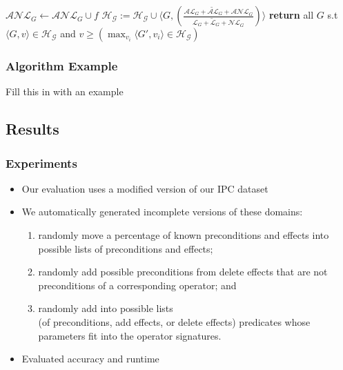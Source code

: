 \documentclass{beamer}
\newcommand{\todo}[1]{ {\color{red} #1} }
\begin{document}
\begin{frame}[c]
\begin{algorithmic}[1]
{							\State $\mathcal{ANL}_{G} \gets \mathcal{ANL}_{G} \cup f$ \label{alg:RecognizeIncompleteDomains:AchievedOverlookedLandmarks}
						\EndIf
					\EndFor
				\EndFor
				\State $\mathcal{H}_{\mathcal{G}} := \mathcal{H}_{\mathcal{G}} \cup \langle G,\left(\frac{\mathcal{AL}_{G} + \mathcal{\widetilde{AL}}_{G} + \mathcal{ANL}_{G}}{\mathcal{L}_{G} + \mathcal{\widetilde{L}}_{G} + \mathcal{NL}_{G}}\right)\rangle$  \label{alg:RecognizeIncompleteDomains:Heuristic}
			\EndFor
			\State \textbf{return} {all $G$ s.t $\langle G, v \rangle \in \mathcal{H}_{\mathcal{G}}$ and \newline \hspace*{\algorithmicindent}{\phantom{return }} $v \geq (\max_{v_i}{ \langle G',v_i \rangle \in \mathcal{H}_{\mathcal{G}}})$} \label{alg:RecognizeIncompleteDomains:Return}
	        \EndFunction
			}
	    \end{algorithmic}
\end{frame}

\begin{frame}[c]\frametitle{Algorithm Example}
	\todo{Fill this in with an example}
\end{frame}


\subsection{Results}

\begin{frame}[c]\frametitle{Experiments}
	\begin{itemize}
		\item Our evaluation uses a modified version of our IPC dataset
		\item We automatically generated incomplete versions of these domains:
		\begin{enumerate}
			\item randomly move a percentage of known preconditions and effects into possible lists of preconditions and effects; 
			\item randomly add possible preconditions from delete effects that are not preconditions of a corresponding operator; and 
			\item randomly add into possible lists \\(of preconditions, add effects, or delete effects) predicates whose parameters fit into the operator signatures.
		\end{enumerate}
		\item Evaluated accuracy and runtime
	\end{itemize}
\end{frame}
\end{document}
